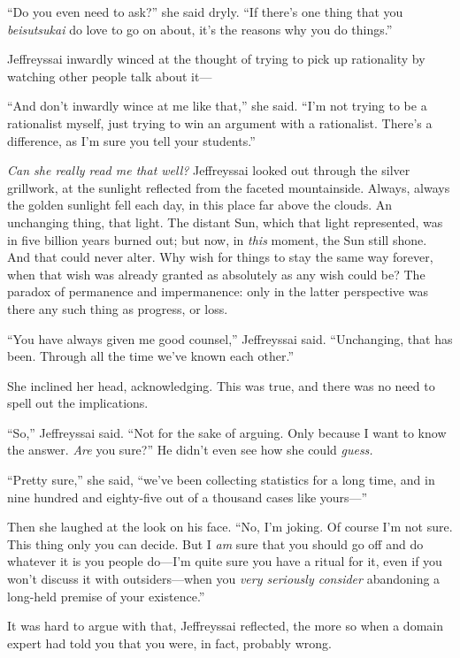 {
 ``Do you even need to ask?''
she said dryly. ``If there's one thing
that you \textit{beisutsukai} do love to go on about,
it's the reasons why you do
things.''}

{
 Jeffreyssai inwardly winced at the thought of trying to pick up
rationality by watching other people talk about it---}

{
 ``And don't inwardly wince at me
like that,'' she said.
``I'm not trying to be a rationalist
myself, just trying to win an argument with a rationalist.
There's a difference, as I'm sure you
tell your students.''}

{
 \textit{Can she really read me that well?} Jeffreyssai looked out
through the silver grillwork, at the sunlight reflected from the
faceted mountainside. Always, always the golden sunlight fell each day,
in this place far above the clouds. An unchanging thing, that light.
The distant Sun, which that light represented, was in five billion
years burned out; but now, in \textit{this} moment, the Sun still
shone. And that could never alter. Why wish for things to stay the same
way forever, when that wish was already granted as absolutely as any
wish could be? The paradox of permanence and impermanence: only in the
latter perspective was there any such thing as progress, or loss.}

{
 ``You have always given me good
counsel,'' Jeffreyssai said.
``Unchanging, that has been. Through all the time
we've known each other.''}

{
 She inclined her head, acknowledging. This was true, and there was
no need to spell out the implications.}

{
 ``So,'' Jeffreyssai said.
``Not for the sake of arguing. Only because I want to
know the answer. \textit{Are} you sure?'' He
didn't even see how she could \textit{guess.}}

{
 ``Pretty sure,'' she said,
``we've been collecting statistics for
a long time, and in nine hundred and eighty-five out of a thousand
cases like yours---''}

{
 Then she laughed at the look on his face. ``No,
I'm joking. Of course I'm not sure.
This thing only you can decide. But I \textit{am} sure that you should
go off and do whatever it is you people do---I'm quite
sure you have a ritual for it, even if you won't
discuss it with outsiders---when you \textit{very seriously consider}
abandoning a long-held premise of your existence.''}

{
 It was hard to argue with that, Jeffreyssai reflected, the more so
when a domain expert had told you that you were, in fact, probably
wrong.}

